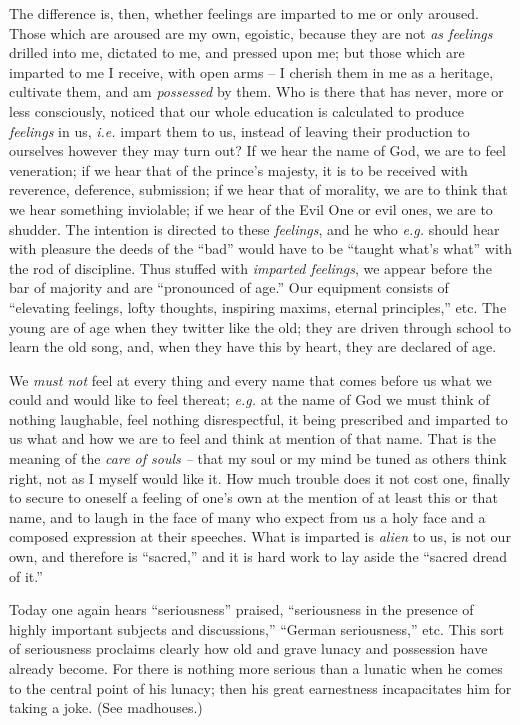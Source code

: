 The difference is, then, whether feelings are imparted to me or only aroused. 
Those which are aroused are my own, egoistic, because they are not \textit{as 
feelings} drilled into me, dictated to me, and pressed upon me; but those 
which are imparted to me I receive, with open arms -- I cherish them in me as 
a heritage, cultivate them, and am \textit{possessed} by them. Who is there 
that has never, more or less consciously, noticed that our whole education is 
calculated to produce \textit{feelings} in us, \textit{i.e.} impart them to 
us, instead of leaving their production to ourselves however they may turn 
out? If we hear the name of God, we are to feel veneration; if we hear that of 
the prince's majesty, it is to be received with reverence, deference, 
submission; if we hear that of morality, we are to think that we hear 
something inviolable; if we hear of the Evil One or evil ones, we are to 
shudder. The intention is directed to these \textit{feelings}, and he who 
\textit{e.g.} should hear with pleasure the deeds of the ``bad'' would have 
to be ``taught what's what'' with the rod of discipline. Thus stuffed with 
\textit{imparted feelings}, we appear before the bar of majority and are 
``pronounced of age.'' Our equipment consists of ``elevating feelings, 
lofty thoughts, inspiring maxims, eternal principles,'' etc. The young are of 
age when they twitter like the old; they are driven through school to learn 
the old song, and, when they have this by heart, they are declared of age.

We \textit{must not} feel at every thing and every name that comes before us 
what we could and would like to feel thereat; \textit{e.g.} at the name of 
God we must think of nothing laughable, feel nothing disrespectful, it being 
prescribed and imparted to us what and how we are to feel and think at mention 
of that name. That is the meaning of the \textit{care of souls --} that my 
soul or my mind be tuned as others think right, not as I myself would like it. 
How much trouble does it not cost one, finally to secure to oneself a feeling 
of one's own at the mention of at least this or that name, and to laugh in the 
face of many who expect from us a holy face and a composed expression at their 
speeches. What is imparted is \textit{alien} to us, is not our own, and 
therefore is ``sacred,'' and it is hard work to lay aside the ``sacred 
dread of it.''

Today one again hears ``seriousness'' praised, ``seriousness in the 
presence of highly important subjects and discussions,'' ``German 
seriousness,'' etc. This sort of seriousness proclaims clearly how old and 
grave lunacy and possession have already become. For there is nothing more 
serious than a lunatic when he comes to the central point of his lunacy; then 
his great earnestness incapacitates him for taking a joke. (See madhouses.)

